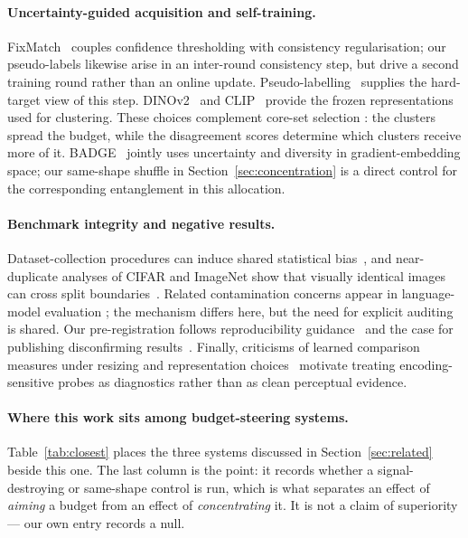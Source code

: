 \documentclass{article}
\begin{document}
\paragraph{Uncertainty-guided acquisition and self-training.}
FixMatch~\citep{sohn2020fixmatch} couples confidence thresholding with consistency regularisation;
our pseudo-labels likewise arise in an inter-round consistency step, but drive a second training
round rather than an online update. Pseudo-labelling~\citep{lee2013pseudo} supplies the hard-target
view of this step. DINOv2~\citep{oquab2024dinov2} and CLIP~\citep{radford2021learning} provide the
frozen representations used for clustering. These choices complement core-set selection
\citep{sener2018active}: the clusters spread the budget, while the disagreement scores determine
which clusters receive more of it. BADGE~\citep{ash2020deep} jointly uses uncertainty and diversity
in gradient-embedding space; our same-shape shuffle in Section~\ref{sec:concentration} is a direct
control for the corresponding entanglement in this allocation.

\paragraph{Benchmark integrity and negative results.}
Dataset-collection procedures can induce shared statistical bias~\citep{torralba2011unbiased}, and
near-duplicate analyses of CIFAR and ImageNet show that visually identical images can cross split
boundaries~\citep{barz2020train}. Related contamination concerns appear in language-model evaluation
\citep{wu2024antileak}; the mechanism differs here, but the need for explicit auditing is shared.
Our pre-registration follows reproducibility guidance~\citep{pineau2021improving} and the case for
publishing disconfirming results~\citep{karl2024position}. Finally, criticisms of learned comparison
measures under resizing and representation choices~\citep{parmar2022aliased,jayasumana2024rethinking}
motivate treating encoding-sensitive probes as diagnostics rather than as clean perceptual evidence.

\paragraph{Where this work sits among budget-steering systems.} Table~\ref{tab:closest} places the
three systems discussed in Section~\ref{sec:related} beside this one. The last column is the point:
it records whether a signal-destroying or same-shape control is run, which is what separates an
effect of \emph{aiming} a budget from an effect of \emph{concentrating} it. It is not a claim of
superiority --- our own entry records a null.
\end{document}
